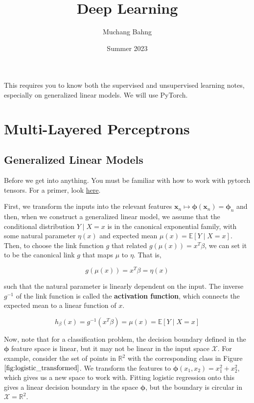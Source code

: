 \documentclass{article}
\begin{document}
\title{Deep Learning}
\author{Muchang Bahng}
\date{Summer 2023}

\maketitle

\tableofcontents

\pagebreak 
%
This requires you to know both the supervised and unsupervised learning notes, especially on generalized linear models. We will use PyTorch. 

\section{Multi-Layered Perceptrons}

  \subsection{Generalized Linear Models}

    \begin{code} 
      Before we get into anything. You must be familiar with how to work with pytorch tensors. For a primer, look \href{code/utilities.ipynb}{here}. 
    \end{code}

     First, we transform the inputs into the relevant features $\mathbf{x}_n \mapsto \boldsymbol{\phi} (\mathbf{x}_n) = \boldsymbol{\phi}_n$ and then, when we construct a generalized linear model, we assume that the conditional distribution $Y \mid X = x$ is in the canonical exponential family, with some natural parameter $\eta(x)$ and expected mean $\mu(x) = \mathbb{E}[Y \mid X = x]$. Then, to choose the link function $g$ that related $g(\mu(x)) = x^T \beta$, we can set it to be the canonical link $g$ that maps $\mu$ to $\eta$. That is, 
    
    \[g(\mu(x)) = x^T \beta = \eta (x)\]

    such that the natural parameter is linearly dependent on the input. The inverse $g^{-1}$ of the link function is called the \textbf{activation function}, which connects the expected mean to a linear function of $x$. 

      \[h_\beta (x) = g^{-1} (x^T \beta) = \mu(x) = \mathbb{E}[Y \mid X = x]\]

    Now, note that for a classification problem, the decision boundary defined in the $\boldsymbol{\phi}$ feature space is linear, but it may not be linear in the input space $\mathcal{X}$. For example, consider the set of points in $\mathbb{R}^2$ with the corresponding class in Figure $\ref{fig:logistic_transformed}$. We transform the features to $\boldsymbol{\phi}(x_1, x_2) = x_1^2 + x_2^2$, which gives us a new space to work with. Fitting logistic regression onto this gives a linear decision boundary in the space $\boldsymbol{\phi}$, but the boundary is circular in $\mathcal{X} = \mathbb{R}^2$. 
\end{document}
